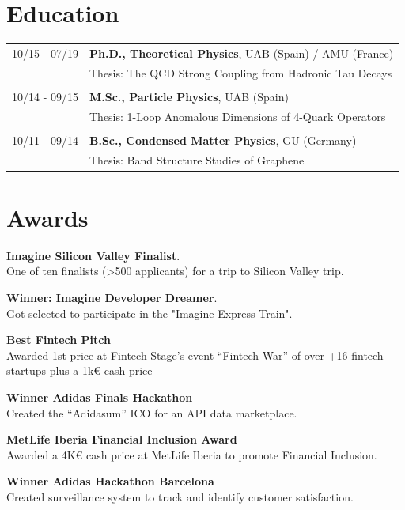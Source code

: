 \documentclass[11pt]{article}
\begin{document}
\section*{Education}
\begin{tabularx}{\textwidth}{lX}
  10/15 - 07/19 & \textbf{Ph.D., Theoretical Physics}, UAB (Spain) / AMU (France) \\
                & Thesis: The QCD Strong Coupling from Hadronic Tau
  Decays                                                                          \\\\
  10/14 - 09/15 & \textbf{M.Sc., Particle Physics}, UAB (Spain)                   \\
                & Thesis: 1-Loop Anomalous Dimensions of 4-Quark
  Operators                                                                       \\\\
  10/11 - 09/14 & \textbf{B.Sc., Condensed Matter Physics}, GU (Germany)          \\
                & Thesis: Band Structure Studies of Graphene
\end{tabularx}

\section*{Awards}
\begin{compactitem}
  \item \textbf{Imagine Silicon Valley Finalist}. \\
        One of ten finalists (>500 applicants) for a trip to Silicon Valley trip.
  \item \textbf{Winner: Imagine Developer Dreamer}. \\
        Got selected to participate in the "Imagine-Express-Train".
  \item \textbf{Best Fintech Pitch} \\
        Awarded 1st price at Fintech Stage's event ``Fintech War'' of over
        +16 fintech startups plus a 1k€ cash price
  \item \textbf{Winner Adidas Finals Hackathon} \\
        Created the ``Adidasum'' ICO for an API data marketplace.
  \item \textbf{MetLife Iberia Financial Inclusion Award} \\
        Awarded a 4K€ cash price at MetLife Iberia to promote Financial Inclusion.
  \item \textbf{Winner Adidas Hackathon Barcelona} \\
        Created surveillance system to track and identify customer satisfaction.
\end{compactitem}
\end{document}
